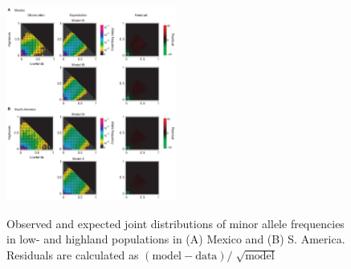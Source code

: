 \begin{figure}[tb]   
  \begin{center}
   \vspace{-0mm}
   \includegraphics[width=0.5\textwidth]{fig/Fig4}
   \renewcommand{\baselinestretch}{0.9}
   \vspace{-3mm}
   \caption{Observed and expected joint distributions of minor allele frequencies in low- and highland populations in (A) Mexico and (B) S. America. Residuals are calculated as  $(\mbox{model}-\mbox{data})/\sqrt[]{\mbox{model}}$}
\vspace{-6mm}
    \label{JFD}
  \end{center}
\end{figure}


